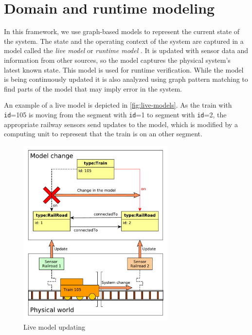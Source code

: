 \section{Domain and runtime modeling}

In this framework, we use graph-based models to represent the current state of the system. 
The state and the operating context of the system are captured in a model called the \emph{live model} or \emph{runtime model} \cite{Szvetits2013, DBLP:journals/computer/BlairBF09}.
It is updated with sensor data and information from other sources, so the model captures the physical system's latest known state.
This model is used for runtime verification.
While the model is being continuously updated it is also analyzed using graph pattern matching to find parts of the model that may imply error in the system.

An example of a live model is depicted in \autoref{fig:live-models}. As the train with \texttt{id}=105 is moving from the segment with \texttt{id}=1 to segment with \texttt{id}=2, the appropriate railway sensors send updates to the model, which is modified by a computing unit to represent that the train is on an other segment.

\begin{figure}[H]
	\begin{center}
		\includegraphics[width=0.7\textwidth]{figures/live-models.pdf}
		\caption{Live model updating}
		\label{fig:live-models}
	\end{center}
\end{figure}


